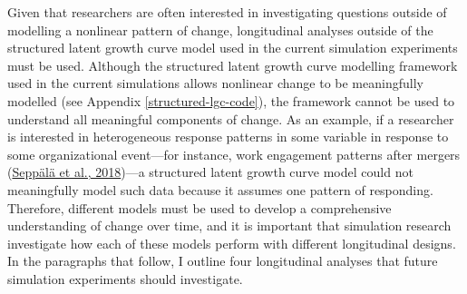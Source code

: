 \documentclass[
12pt, %
twoside,
english]{guelphthesis}
\begin{document}
Given that researchers are often interested in investigating questions outside of modelling a nonlinear pattern of change, longitudinal analyses outside of the structured latent growth curve model used in the current simulation experiments must be used. Although the structured latent growth curve modelling framework used in the current simulations allows nonlinear change to be meaningfully modelled (see Appendix \ref{structured-lgc-code}), the framework cannot be used to understand all meaningful components of change. As an example, if a researcher is interested in heterogeneous response patterns in some variable in response to some organizational event---for instance, work engagement patterns after mergers (\protect\hyperlink{ref-seppuxe4luxe42018}{Seppälä et al., 2018})---a structured latent growth curve model could not meaningfully model such data because it assumes one pattern of responding. Therefore, different models must be used to develop a comprehensive understanding of change over time, and it is important that simulation research investigate how each of these models perform with different longitudinal designs. In the paragraphs that follow, I outline four longitudinal analyses that future simulation experiments should investigate.
\end{document}

